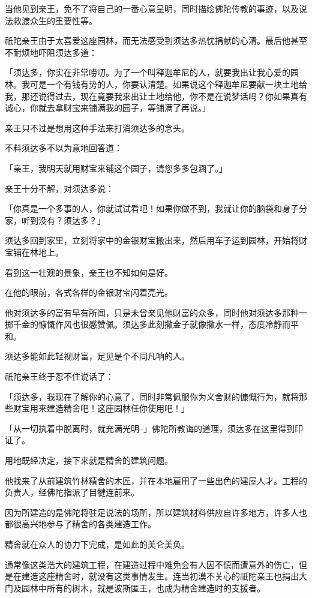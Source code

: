 \documentclass[twoside,openany]{book}
\begin{document}
当他见到亲王，免不了将自己的一番心意呈明，同时描绘佛陀传教的事迹，以及说法救渡众生的重要性等。

祇陀亲王由于太喜爱这座园林，而无法感受到须达多热忱捐献的心清。最后他甚至不耐烦地吓阻须达多道：

「须达多，你实在非常唠叨。为了一个叫释迦牟尼的人，就要我出让我心爱的园林。我可是一个有钱有势的人，你要认清楚。如果说这个释迦牟尼要献一块土地给我，那还说得过去，现在竟要我来出让土地给他，你不是在说梦话吗？你如果真有诚心，你就去拿财宝来铺满我的园子，等铺满了再说。」

亲王只不过是想用这种手法来打消须达多的念头。

不料须达多不以为意地回答道：

「亲王，我明天就用财宝来铺这个园子，请您多多包涵了。」

亲王十分不解，对须达多说：

「你真是一个多事的人，你就试试看吧！如果你做不到，我就让你的脑袋和身子分家，听到没有？须达多？」

须达多回到家里，立刻将家中的金银财宝搬出来，然后用车子运到园林，开始将财宝铺在林地上。

看到这一壮观的景象，亲王也不知如何是好。

在他的眼前，各式各样的金银财宝闪着亮光。

他对须达多的富有早有所闻，只是未曾亲见他财富的众多，同时他对须达多那种一掷千金的慷慨作风也很感赞佩。须达多此刻撒金子就像撒水一样，态度冷静而平和。

须达多能如此轻视财富，足见是个不同凡响的人。

祇陀亲王终于忍不住说话了：

「须达多，我现在了解你的心意了，同时非常佩服你为义舍财的慷慨行为，就将那些财宝用来建造精舍吧！这座园林任你使用吧！」

「从一切执着中脱离时，就充满光明--」佛陀所教诲的道理，须达多在这里得到印证了。

用地既经决定，接下来就是精舍的建筑问题。

他找来了从前建筑竹林精舍的木匠，并在本地雇用了一些出色的建屋人才。工程的负责人，经佛陀指派了目犍连前来。

因为所建造的是佛陀将驻足说法的场所，所以建筑材料供应自许多地方，许多人也都很高兴地参与了精舍的各类建造工作。

精舍就在众人的协力下完成，是如此的美仑美奂。

通常像这类浩大的建筑工程，在建造过程中难免会有人因不慎而遭意外的伤亡，但是在建造这座精舍时，就没有这类事情发生。连当初漠不关心的祇陀亲王也捐出大门及园林中所有的树木，就是波斯匿王，也成为精舍建造时的支援者。
\end{document}
